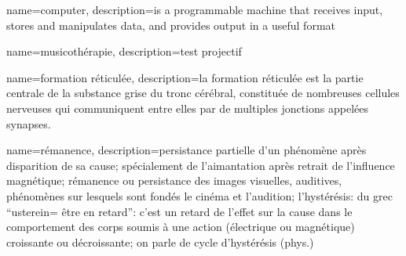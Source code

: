 {
  name=computer,
  description={is a programmable machine that receives input,
               stores and manipulates data, and provides
               output in a useful format}
}

{
  name=musicothérapie,
  description={test projectif}
}


{
  name=formation réticulée,
  description={la formation 
réticulée est la partie centrale de la substance grise du tronc cérébral, 
constituée de nombreuses cellules nerveuses qui communiquent entre elles par de 
multiples jonctions appelées synapses.}
}






{
  name=rémanence,
  description={persistance partielle d'un phénomène après disparition
  de sa cause; spécialement de l'aimantation après retrait de
  l'influence magnétique; rémanence ou persistance des images
  visuelles, auditives, phénomènes sur lesquels sont fondés le cinéma
  et l'audition; l'hystérésis: du grec ``usterein= être en retard'':
  c'est un retard de l'effet sur la cause dans le comportement des
  corps soumis à une action (électrique ou magnétique) croissante ou
  décroissante; on parle de cycle d'hystérésis (phys.)}
}
